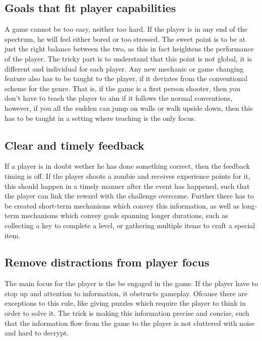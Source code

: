 \subsection{Goals that fit player capabilities}
A game cannot be too easy, neither too hard. If the player is in any end of the spectrum, he will feel either bored or too stressed. The sweet point is to be at just the right balance between the two, as this in fact heightens the performance of the player. The tricky part is to understand that this point is not global, it is different and individual for each player. Any new mechanic or game changing feature also has to be taught to the player, if it deviates from the conventional scheme for the genre. That is, if the game is a first person shooter, then you don't have to teach the player to aim if it follows the normal conventions, however, if you all the sudden can jump on walls or walk upside down, then this has to be taught in a setting where teaching is the only focus.

\subsection{Clear and timely feedback}
If a player is in doubt wether he has done something correct, then the feedback timing is off. If the player shoots a zombie and receives experience points for it, this should happen in a timely manner after the event has happened, such that the player can link the reward with the challenge overcome. Further there has to be created short-term mechanisms which convey this information, as well as long-term mechanisms which convey goals spanning longer durations, such as collecting a key to complete a level, or gathering multiple items to craft a special item.

\subsection{Remove distractions from player focus}
The main focus for the player is the be engaged in the game. If the player have to stop up and attention to information, it obstructs gameplay. Ofcause there are exceptions to this rule, like giving puzzles which require the player to think in order to solve it. The trick is making this information precise and concise, such that the information flow from the game to the player is not cluttered with noise and hard to decrypt.

